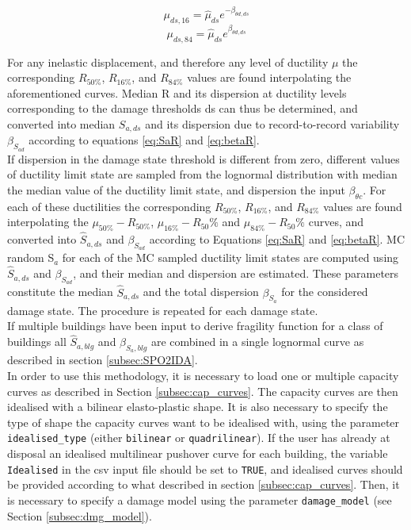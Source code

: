 \begin{equation}
\mu_{ds,16} = \hat{\mu}_{ds} e^{-\beta_{\theta d,ds}}
\label{eq:mu16-beta}
\end{equation}
\begin{equation}
\mu_{ds,84} = \hat{\mu}_{ds} e^{\beta_{\theta d,ds}}
\label{eq:mu84-beta}
\end{equation}

For any inelastic displacement, and therefore any level of ductility $\mu$ the corresponding $R_{50\%}$, $R_{16\%}$, and $R_{84\%}$ values are found interpolating the aforementioned curves. Median R and its dispersion at ductility levels corresponding to the damage thresholds ds can thus be determined, and converted into median $S_{a, ds}$ and its dispersion due to record-to-record variability $\beta_{S_{a d}}$ according to equations \ref{eq:SaR} and \ref{eq:betaR}. \\

If dispersion in the damage state threshold is different from zero, different values of ductility limit state are sampled from the lognormal distribution with median the median value of the ductility limit state, and dispersion the input $\beta_{\theta c}$. For each of these ductilities the corresponding $R_{50\%}$, $R_{16\%}$, and $R_{84\%}$ values are found interpolating the $\mu_{50\%}-R_{50\%}$, $\mu_{16\%}-R_50\%$ and $\mu_{84\%}-R_50\%$ curves, and converted into $\hat{S}_{a,ds}$ and $\beta_{S_{a d}}$ according to Equations \ref{eq:SaR} and \ref{eq:betaR}. MC random S$_a$ for each of the MC sampled ductility limit states are computed using $\hat{S}_{a,ds}$ and $\beta_{S_{a d}}$, and their median and dispersion are estimated. These parameters constitute the median $\hat{S}_{a,ds}$ and the total dispersion $\beta_{S_a}$ for the considered damage state. The procedure is repeated for each damage state.\\

 If multiple buildings have been input to derive fragility function for a class of buildings all $\hat{S}_{a, blg}$ and $\beta_{S_a, blg}$ are combined in a single lognormal curve as described in section \ref{subsec:SPO2IDA}. \\
 
In order to use this methodology, it is necessary to load one or multiple capacity curves as described in Section \ref{subsec:cap_curves}. The capacity curves are then idealised with a bilinear elasto-plastic shape. It is also necessary to specify the type of shape the capacity curves want to be idealised with, using the parameter \verb=idealised_type= (either \verb=bilinear= or \verb=quadrilinear=). If the user has already at disposal an idealised multilinear pushover curve for each building, the variable \verb=Idealised= in the csv input file should be set to \verb=TRUE=, and idealised curves should be provided according to what described in section \ref{subsec:cap_curves}. Then, it is necessary to specify a damage model using the parameter \verb=damage_model= (see Section \ref{subsec:dmg_model}).

